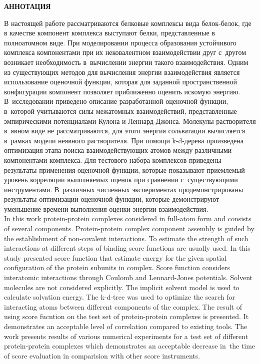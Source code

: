 \newpage
\begin{center}
  \textbf{\large АННОТАЦИЯ}
\end{center}

В настоящей работе рассматриваются белковые комплексы вида белок-белок, где в качестве компонент комплекса выступают белки, представленные в полноатомном виде. При моделировании процесса образования устойчивого комплекса компонентами при их нековалентном взаимодействии друг с~другом возникает необходимость в~вычислении энергии такого взаимодействия. Одним из существующих методов для вычисления энергии взаимодействия является использование оценочной функции, которая для заданной пространственной конфигурации компонент позволяет приближенно оценить искомую энергию. В~исследовании приведено описание разработанной оценочной функции, в~которой учитываются силы межатомных взаимодействий, представленные эмпирическими потенциалами Кулона и Леннард-Джонса. Молекулы растворителя в~явном виде не рассматриваются, для этого энергия сольватации вычисляется в~рамках модели неявного растворителя. При помощи k-d-дерева произведена оптимизация этапа поиска взаимодействующих атомов между различными компонентами комплекса. Для тестового набора комплексов приведены результаты применения оценочной функции, которые показывают приемлемый уровень корреляции выполняемых оценок при сравнении с~существующими инструментами. В~различных численных экспериментах продемонстрированы результаты оптимизации оценочной функции, которые демонстрируют уменьшение времени выполнения оценки энергии взаимодействия. \\


In this work protein-protein complexes considered in full-atom form and consists of several components. Protein-protein complex component assembly is guided by the establishment of non-covalent interactions. To estimate the strength of such interactions at different steps of binding score functions are usually used. In this study presented score function that estimate energy for the given spatial configuration of the protein subunits in complex. Score function considers interatomic interactions through Coulomb and Lennard-Jones potentials. Solvent molecules are not considered explicitly. The implicit solvent model is used to calculate solvation energy. The k-d-tree was used to optimize the search for interacting atoms between different components of the complex. The result of using score fucntion on the test set of protein-protein complexes is presented. It demonstrates an acceptable level of correlation compared to existing tools. The work presents results of various numerical experiments for a test set of different protein-protein complexes which demonstrates an acceptable decrease in~the time of score evaluation in comparision with other score instruments.

